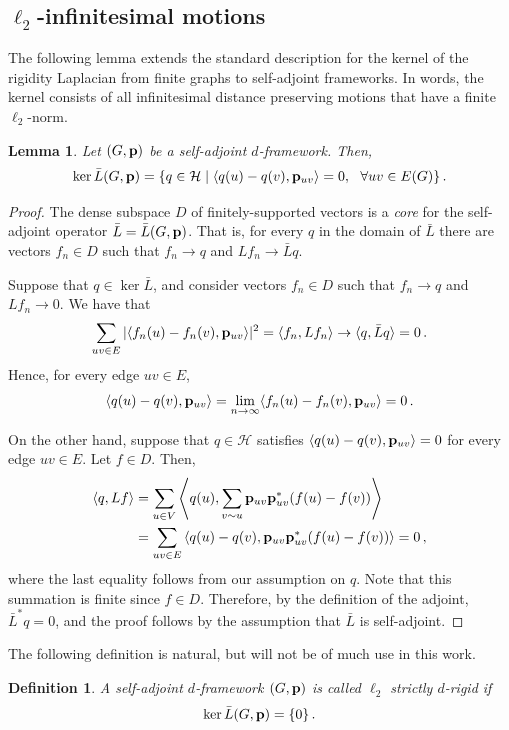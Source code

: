 \documentclass[10pt,a4paper]{amsart}
\numberwithin{equation}{section}
\newtheorem{lemma}[theorem]{Lemma}
\newtheorem{definition}[theorem]{Definition}
\newcommand{\cH}{\mathcal H}
\newcommand{\p}{{\bf p}}
\begin{document}
\subsection{$\ell_2$-infinitesimal motions}
The following lemma extends the standard description for the kernel of the rigidity Laplacian from finite graphs to self-adjoint frameworks. In words, the kernel consists of all infinitesimal distance preserving motions that have a finite $\ell_2$-norm.
\begin{lemma}\label{lem:kernel}
Let $(G,\p)$ be a self-adjoint $d$-framework. Then,
\[
\ker \bar L(G,\p) = \{q\in\cH\mid \langle q(u)-q(v),\p_{uv}\rangle=0,~~\forall uv \in E(G)\}\,.
\]
\end{lemma}
\begin{proof}
The dense subspace $D$ of finitely-supported vectors is a {\em core} for the self-adjoint operator $\bar L=\bar L(G,\p)$. That is, for every $q$ in the domain of $\bar L$ there are vectors $f_n \in D$ such that $f_n\to q$ and $Lf_n\to \bar L q$. 

Suppose that $q\in \ker \bar L$, and consider vectors $f_n \in D$ such that $f_n\to q$ and $Lf_n\to 0$. We have that
\[
\sum_{uv\in E}|\langle f_n(u)-f_n(v),\p_{uv}\rangle|^2 = \langle f_n,Lf_n\rangle \to \langle q,\bar Lq\rangle =0\,.
\]
Hence, for every edge $uv \in E$, 
\[
\langle q(u)-q(v),\p_{uv}\rangle=\lim_{n\to \infty}\langle f_n(u)-f_n(v),\p_{uv}\rangle = 0\,.
\]

On the other hand, suppose that $q\in\cH$ satisfies $\langle q(u)-q(v),\p_{uv}\rangle=0$ for every edge $uv\in E$. Let $f\in D$. Then,
\begin{align*}
\langle q,Lf\rangle &= \sum_{u \in V}\left\langle q(u),\sum_{v\sim u}\p_{uv}\p_{uv}^*(f(u)-f(v)) \right\rangle \\
&= \sum_{uv\in E}\left\langle q(u)-q(v),\p_{uv}\p_{uv}^*(f(u)-f(v)) \right\rangle=0\,,
\end{align*}
where the last equality follows from our assumption on $q$. Note that this summation is finite since $f\in D$. Therefore, by the definition of the adjoint, $\bar L^*q=0$, and the proof follows by the assumption that $\bar L$ is self-adjoint.
\end{proof}

The following definition is natural, but will not be of much use in this work.
\begin{definition}
    A self-adjoint $d$-framework $(G,\p)$ is called $\ell_2$ \emph{strictly $d$-rigid} if \[\ker \bar L(G,\p)=\{0\}\,.\]
\end{definition}
\end{document}
